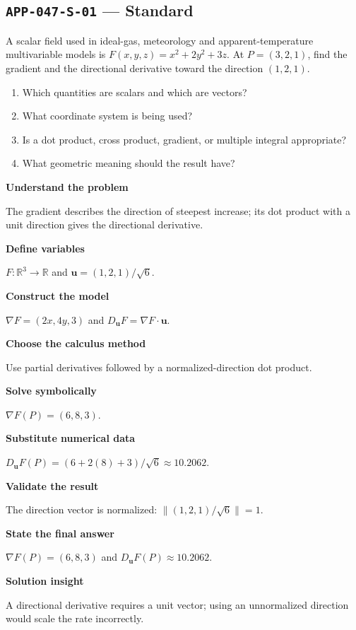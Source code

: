 \documentclass[11pt]{book}
\newcommand{\pid}[1]{\texttt{#1}}
\begin{document}
\subsection*{\pid{APP-047-S-01} — Standard}
\begin{problembox}
A scalar field used in ideal-gas, meteorology and apparent-temperature multivariable models is $F(x,y,z)=x^2+2y^2+3z$. At $P=(3,2,1)$, find the gradient and the directional derivative toward the direction $(1,2,1)$.
\end{problembox}
\begin{promptbox}\begin{enumerate}
\item Which quantities are scalars and which are vectors?
\item What coordinate system is being used?
\item Is a dot product, cross product, gradient, or multiple integral appropriate?
\item What geometric meaning should the result have?
\end{enumerate}\end{promptbox}
\begin{solutionbox}
\textbf{Understand the problem}\par The gradient describes the direction of steepest increase; its dot product with a unit direction gives the directional derivative.\par\medskip
\textbf{Define variables}\par $F:\mathbb R^3\to\mathbb R$ and $\mathbf u=(1,2,1)/\sqrt6$.\par\medskip
\textbf{Construct the model}\par $\nabla F=(2x,4y,3)$ and $D_{\mathbf u}F=\nabla F\cdot\mathbf u$.\par\medskip
\textbf{Choose the calculus method}\par Use partial derivatives followed by a normalized-direction dot product.\par\medskip
\textbf{Solve symbolically}\par $\nabla F(P)=(6,8,3)$.\par\medskip
\textbf{Substitute numerical data}\par $D_{\mathbf u}F(P)=(6+2(8)+3)/\sqrt6\approx 10.2062$.\par\medskip
\textbf{Validate the result}\par The direction vector is normalized: $\|(1,2,1)/\sqrt6\|=1$.\par\medskip
\textbf{State the final answer}\par $\nabla F(P)=(6,8,3)$ and $D_{\mathbf u}F(P)\approx 10.2062$.\par\medskip
\textbf{Solution insight}\par A directional derivative requires a unit vector; using an unnormalized direction would scale the rate incorrectly.\par\medskip
\end{solutionbox}
\end{document}
